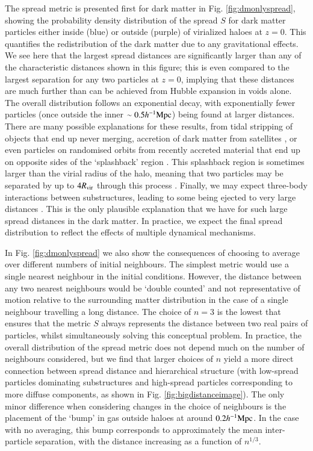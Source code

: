 \documentclass[fleqn,usenatbib]{mnras}
\newcommand{\hmpc}{h^{-1}{\rm Mpc}}
\begin{document}
The spread metric is presented first for dark matter in Fig.
\ref{fig:dmonlyspread}, showing the probability density distribution of the
spread $S$ for dark matter particles either inside (blue) or outside (purple)
of virialized haloes at $z=0$. This quantifies the redistribution of the dark
matter due to any gravitational effects. We see here that the largest spread
distances are significantly larger than any of the characteristic distances
shown in this figure; this is even compared to the largest separation for any
two particles at $z=0$, implying that these distances are much further than
can be achieved from Hubble expansion in voids alone. The overall
distribution follows an exponential decay, with exponentially fewer particles
(once outside the inner $\sim 0.5 \hmpc{}$) being found at larger distances.
There are many possible explanations for these results, from tidal stripping
of objects that end up never merging, accretion of dark matter from
satellites \citep[see e.g. the effects in ][]{VandenBosch2018}, or even
particles on randomised orbits from recently accreted material that end up on
opposite sides of the `splashback' region \citep{Diemer2014, Adhikari2014}.
This splashback region is sometimes larger than the virial radius of the
halo, meaning that two particles may be separated by up to $4R_{\rm vir}$
through this process \citep{Diemer2017a}. Finally, we may expect three-body
interactions between substructures, leading to some being ejected to very
large distances \citep[up to $6R_{\rm vir}$; see][]{Ludlow2009}. This is the
only plausible explanation that we have for such large spread distances in
the dark matter. In practice, we expect the final spread distribution to
reflect the effects of multiple dynamical mechanisms.

In Fig. \ref{fig:dmonlyspread} we also show the consequences of choosing to
average over different numbers of initial neighbours. The simplest metric
would use a single nearest neighbour in the initial conditions. However, the
distance between any two nearest neighbours would be ‘double counted’ and not
representative of motion relative to the surrounding matter distribution in
the case of a single neighbour travelling a long distance. The choice of
$n=3$ is the lowest that ensures that the metric $S$ always represents the
distance between two real pairs of particles, whilst simultaneously solving
this conceptual problem. In practice, the overall distribution of the spread
metric does not depend much on the number of neighbours considered, but we
find that larger choices of $n$ yield a more direct connection between spread
distance and hierarchical structure (with low-spread particles dominating
substructures and high-spread particles corresponding to more diffuse
components, as shown in Fig. \ref{fig:bigdistanceimage}). The only minor difference
when considering changes in the choice of neighbours is the placement of the
`bump' in gas outside haloes at around $0.2\hmpc{}$. In the case with no averaging,
this bump corresponds to approximately the mean inter-particle separation, with
the distance increasing as a function of $n^{1/3}$.
\end{document}
